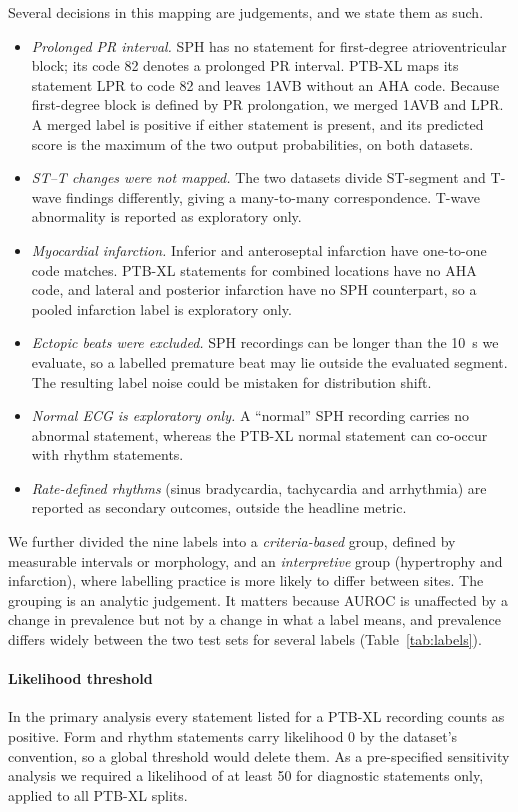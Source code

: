 \documentclass[preprint,12pt]{elsarticle}
\begin{document}
Several decisions in this mapping are judgements, and we state them as such.
\begin{itemize}
  \item \emph{Prolonged PR interval.} SPH has no statement for first-degree atrioventricular block; its code 82 denotes a prolonged PR interval. PTB-XL maps its statement LPR to code 82 and leaves 1AVB without an AHA code. Because first-degree block is defined by PR prolongation, we merged 1AVB and LPR. A merged label is positive if either statement is present, and its predicted score is the maximum of the two output probabilities, on both datasets.
  \item \emph{ST--T changes were not mapped.} The two datasets divide ST-segment and T-wave findings differently, giving a many-to-many correspondence. T-wave abnormality is reported as exploratory only.
  \item \emph{Myocardial infarction.} Inferior and anteroseptal infarction have one-to-one code matches. PTB-XL statements for combined locations have no AHA code, and lateral and posterior infarction have no SPH counterpart, so a pooled infarction label is exploratory only.
  \item \emph{Ectopic beats were excluded.} SPH recordings can be longer than the 10~s we evaluate, so a labelled premature beat may lie outside the evaluated segment. The resulting label noise could be mistaken for distribution shift.
  \item \emph{Normal ECG is exploratory only.} A ``normal'' SPH recording carries no abnormal statement, whereas the PTB-XL normal statement can co-occur with rhythm statements.
  \item \emph{Rate-defined rhythms} (sinus bradycardia, tachycardia and arrhythmia) are reported as secondary outcomes, outside the headline metric.
\end{itemize}

We further divided the nine labels into a \emph{criteria-based} group, defined by measurable intervals or morphology, and an \emph{interpretive} group (hypertrophy and infarction), where labelling practice is more likely to differ between sites. The grouping is an analytic judgement. It matters because AUROC is unaffected by a change in prevalence but not by a change in what a label means, and prevalence differs widely between the two test sets for several labels (Table~\ref{tab:labels}).

\paragraph{Likelihood threshold} In the primary analysis every statement listed for a PTB-XL recording counts as positive. Form and rhythm statements carry likelihood 0 by the dataset's convention, so a global threshold would delete them. As a pre-specified sensitivity analysis we required a likelihood of at least 50 for diagnostic statements only, applied to all PTB-XL splits.
\end{document}
